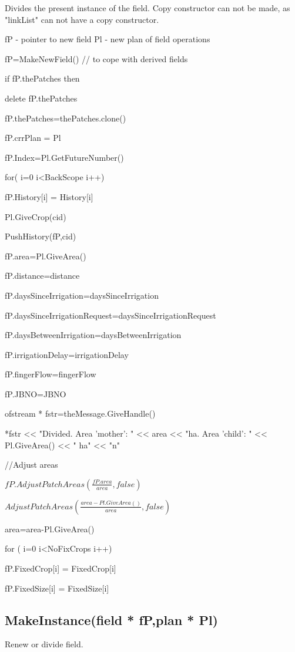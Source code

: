 \documentclass[%
]{scrartcl}
\begin{document}
Divides the present instance of the field.
Copy constructor can not be made, as "linkList" can not have a copy constructor.

   fP - pointer to new field
   Pl - new plan of field operations

   fP=MakeNewField()
	// to cope with derived fields
   
   if fP.thePatches then
   
     \quad   delete fP.thePatches
      
	fP.thePatches=thePatches.clone()
	
	fP.crrPlan = Pl
	
   fP.Index=Pl.GetFutureNumber()
   
	for( i=0 i<BackScope i++)
	
	  \quad	fP.History[i] = History[i]
		
	
	Pl.GiveCrop(cid)
	
	PushHistory(fP,cid)
	
	fP.area=Pl.GiveArea()
	
	fP.distance=distance

   fP.daysSinceIrrigation=daysSinceIrrigation

	 fP.daysSinceIrrigationRequest=daysSinceIrrigationRequest
	 
   fP.daysBetweenIrrigation=daysBetweenIrrigation
   
   fP.irrigationDelay=irrigationDelay
   
   fP.fingerFlow=fingerFlow

	fP.JBNO=JBNO
	
	ofstream * fstr=theMessage.GiveHandle()
	
	*fstr << "Divided. Area 'mother': 
" << area << "ha. Area 'child': " << Pl.GiveArea() << " ha" << "n"

   //Adjust areas
   
$   fP.AdjustPatchAreas(\tfrac{fP.area}{area},false)$
   
 $  AdjustPatchAreas(\tfrac{area-Pl.GiveArea()}{area},false)$
   
	area=area-Pl.GiveArea()
	
   for ( i=0  i<NoFixCrops i++)
   
     \quad	fP.FixedCrop[i] = FixedCrop[i]
     
      \quad  fP.FixedSize[i] = FixedSize[i]
   

\subsection{MakeInstance(field * fP,plan * Pl)}
Renew or divide field.
\end{document}
